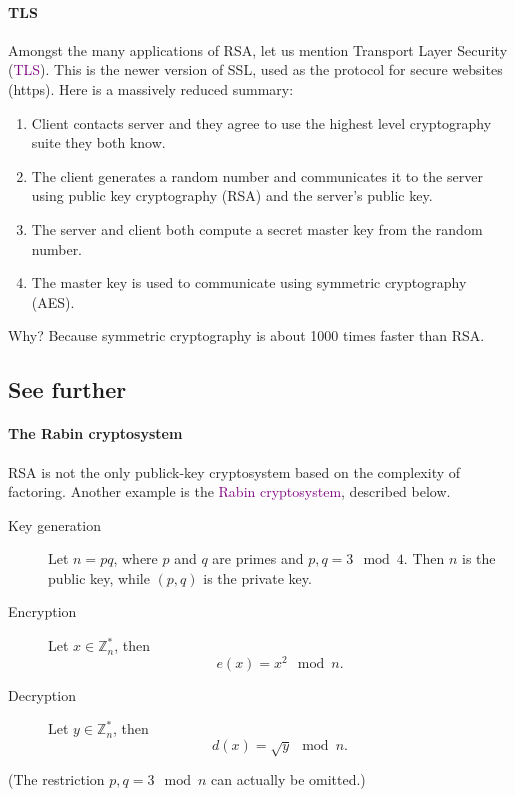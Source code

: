 \documentclass[a4paper, 11pt, openany]{book}
\numberwithin{equation}{section}
\theoremstyle{plain}
\theoremstyle{definition}
\newcommand{\Z}{\mathbb{Z}}
\newcommand{\Define}[1]{\textcolor{purple}{#1}}
\begin{document}
\paragraph{TLS}
Amongst the many applications of RSA, let us mention Transport Layer Security (\Define{TLS}). This is the newer version of SSL, used as the protocol for secure websites (https). Here is a massively reduced summary: 
\begin{enumerate}
	\item Client contacts server and they agree to use the highest level cryptography suite they both know.
	
	\item The client generates a random number and communicates it to the server using public key cryptography (RSA) and the server’s public key.
	
	\item The server and client both compute a secret master key from the random number.
	
	\item The master key is used to communicate using symmetric cryptography (AES).
\end{enumerate}
Why? Because symmetric cryptography is about 1000 times faster than RSA.




\subsection{See further}

\paragraph{The Rabin cryptosystem}
RSA is not the only publick-key cryptosystem based on the complexity of factoring. Another example is the \Define{Rabin cryptosystem}, described below.
\begin{description}
    \item[Key generation] Let $n = pq$, where $p$ and $q$ are primes and $p,q = 3 \mod 4$. Then $n$ is the public key, while $(p,q)$ is the private key.
    
    \item[Encryption] Let $x \in \Z_n^*$, then
    \[
        e(x) = x^2 \mod n.
    \]
    
    \item[Decryption] Let $y \in \Z_n^*$, then
    \[
        d(x) = \sqrt{y} \mod n.
    \]
\end{description}
(The restriction $p,q = 3 \mod n$ can actually be omitted.)
\end{document}
